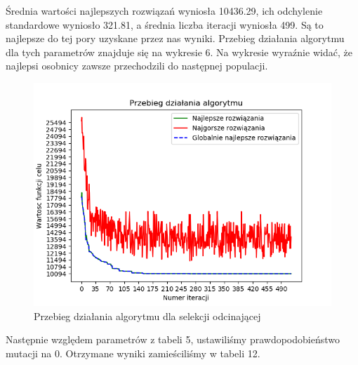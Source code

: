 \documentclass[12pt]{article}
\begin{document}
\begin{table}[H]
\caption{Wyniki testów dla selekcji odcinającej}
\begin{center}
\end{center}
\end{table}
Średnia wartości najlepszych rozwiązań wyniosła 10436.29, ich odchylenie standardowe wyniosło 321.81, a średnia liczba iteracji wyniosła 499. Są to najlepsze do tej pory uzyskane przez nas wyniki. Przebieg działania algorytmu dla tych parametrów znajduje się na wykresie 6. Na wykresie wyraźnie widać, że najlepsi osobnicy zawsze przechodzili do następnej populacji.
\begin{figure}[H]
\caption{Przebieg działania algorytmu dla selekcji odcinającej}
\includegraphics[scale=1]{truncation=30.png}
\end{figure}
\par
Następnie względem parametrów z tabeli 5, ustawiliśmy prawdopodobieństwo mutacji na 0. Otrzymane wyniki zamieściliśmy w tabeli 12.
\begin{table}[H]
\caption{Wyniki testów dla algorytmu bez mutacji}
\begin{center}
\end{center}
\end{table}
\end{document}
